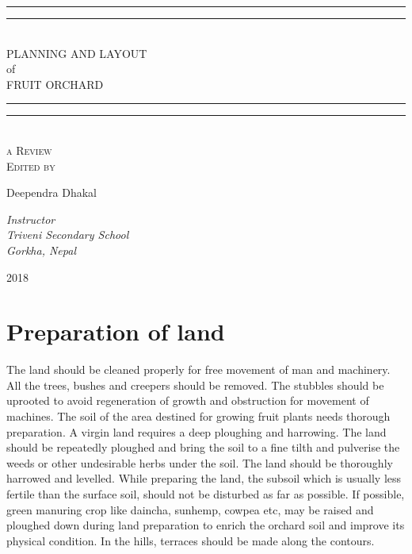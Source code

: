 \documentclass{book}
\newlength{\drop}
\begin{document}
\begin{titlepage}
	\textheight
	\centering
	\vspace*{\baselineskip}
	\rule{\textwidth}{1.6pt}\vspace*{-\baselineskip}\vspace*{2pt}
	\rule{\textwidth}{0.4pt}\\[\baselineskip]
	{\Large PLANNING AND LAYOUT\\ of \\[0.3\baselineskip] FRUIT ORCHARD}\\[0.2\baselineskip]
	\rule{\textwidth}{0.4pt}\vspace*{-\baselineskip}\vspace{3.2pt}
	\rule{\textwidth}{1.6pt}\\[\baselineskip]
	\scshape
	a Review \\ %
	\vspace*{2\baselineskip}
	Edited by \\[\baselineskip]
	{\Large Deependra Dhakal\par} %
	{\itshape Instructor \\ Triveni Secondary School \\ Gorkha, Nepal\par} %
	\vfill
	{\scshape 2018} \\
\end{titlepage}

\section{Preparation of land}

The land should be cleaned properly for free movement of man and machinery. All the trees, bushes and creepers should be removed. The stubbles should be uprooted to avoid regeneration of growth and obstruction for movement of machines. The soil of the area destined for growing fruit plants needs thorough preparation. A virgin land requires a deep ploughing and harrowing. The land should be repeatedly ploughed and bring the soil to a fine tilth and pulverise the weeds or other undesirable herbs under the soil. The land should be thoroughly harrowed and levelled. While preparing the land, the subsoil which is usually less fertile than the surface soil, should not be disturbed as far as possible. If possible, green manuring crop like daincha, sunhemp, cowpea etc, may be raised and ploughed down during land preparation to enrich the orchard soil and improve its physical condition. In the hills, terraces should be made along the contours.
\end{document}
